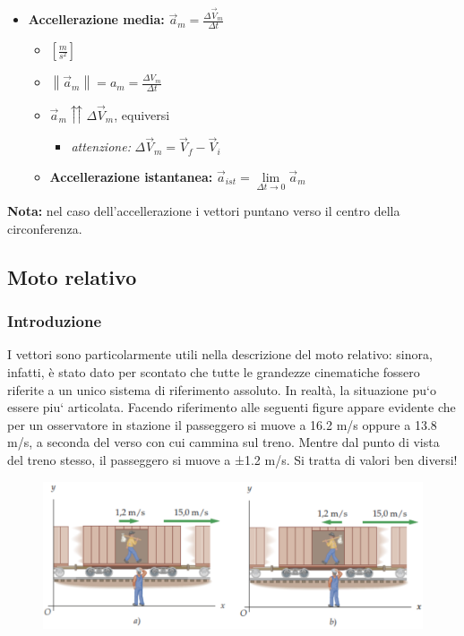 \documentclass[../main.tex]{subfiles}
\begin{document}
\vspace{1.25cm}
\begin{itemize}
    \item \textbf{Accellerazione media:} $\vec{a}_m = \frac{\Delta \vec{V}_m}{\Delta t}$
    \begin{itemize}
        \item $[\frac{m}{s^2}]$
        \item $\left\lVert \vec{a}_m\right\rVert = a_m = \frac{\Delta V_m}{\Delta t} $
        \item $\vec{a}_m\upuparrows \Delta\vec{V}_m$, equiversi
        \begin{itemize}
            \item \textit{attenzione:} $\Delta \vec{V}_m = \vec{V}_f - \vec{V}_i$
        \end{itemize}
        \item \textbf{Accellerazione istantanea:} $\vec{a}_{ist} = \lim\limits_{\Delta t \to 0}\vec{a}_m $
    \end{itemize}
\end{itemize}
\textbf{Nota:} nel caso dell'accellerazione i vettori puntano verso il centro della circonferenza.

\subsection{Moto relativo}
\subsubsection{Introduzione}
I vettori sono particolarmente utili nella descrizione del moto relativo: sinora, infatti, è stato dato per scontato che tutte le grandezze
cinematiche fossero riferite a un unico sistema di riferimento assoluto. In realtà, la situazione pu`o essere piu` articolata. Facendo 
riferimento alle seguenti figure appare evidente che per un osservatore in stazione il passeggero si muove a 16.2 m/s oppure a 13.8 m/s, 
a seconda del verso con cui cammina sul treno. Mentre dal punto di vista del treno stesso, il passeggero si muove a ±1.2 m/s. Si tratta 
di valori ben diversi!
\begin{figure}[h]
    \centering
    \includegraphics[width=1\textwidth]{images/motoRelativo.png}
\end{figure}
\end{document}
